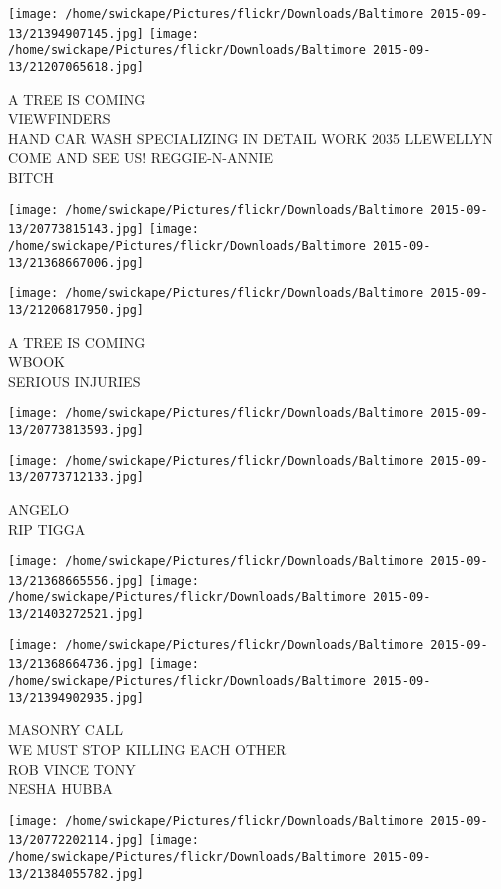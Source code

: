 \documentclass[10pt,letterpaper]{article}
\begin{document}
\texttt{[image: /home/swickape/Pictures/flickr/Downloads/Baltimore 2015-09-13/21394907145.jpg]}
\texttt{[image: /home/swickape/Pictures/flickr/Downloads/Baltimore 2015-09-13/21207065618.jpg]}

A TREE IS COMING\\
VIEWFINDERS\\
HAND CAR WASH SPECIALIZING IN DETAIL WORK 2035 LLEWELLYN COME AND SEE US!  REGGIE{-}N{-}ANNIE\\
BITCH\\
\pagebreak

\texttt{[image: /home/swickape/Pictures/flickr/Downloads/Baltimore 2015-09-13/20773815143.jpg]}
\texttt{[image: /home/swickape/Pictures/flickr/Downloads/Baltimore 2015-09-13/21368667006.jpg]}

\texttt{[image: /home/swickape/Pictures/flickr/Downloads/Baltimore 2015-09-13/21206817950.jpg]}

A TREE IS COMING\\
WBOOK\\
SERIOUS INJURIES\\
\pagebreak

\texttt{[image: /home/swickape/Pictures/flickr/Downloads/Baltimore 2015-09-13/20773813593.jpg]}

\vspace{0.25in}
\texttt{[image: /home/swickape/Pictures/flickr/Downloads/Baltimore 2015-09-13/20773712133.jpg]}

ANGELO\\
RIP TIGGA\\
\pagebreak

\texttt{[image: /home/swickape/Pictures/flickr/Downloads/Baltimore 2015-09-13/21368665556.jpg]}
\texttt{[image: /home/swickape/Pictures/flickr/Downloads/Baltimore 2015-09-13/21403272521.jpg]}

\texttt{[image: /home/swickape/Pictures/flickr/Downloads/Baltimore 2015-09-13/21368664736.jpg]}
\texttt{[image: /home/swickape/Pictures/flickr/Downloads/Baltimore 2015-09-13/21394902935.jpg]}

MASONRY CALL\\
WE MUST STOP KILLING EACH OTHER\\
ROB VINCE TONY\\
NESHA HUBBA\\
\pagebreak

\texttt{[image: /home/swickape/Pictures/flickr/Downloads/Baltimore 2015-09-13/20772202114.jpg]}
\texttt{[image: /home/swickape/Pictures/flickr/Downloads/Baltimore 2015-09-13/21384055782.jpg]}
\end{document}
